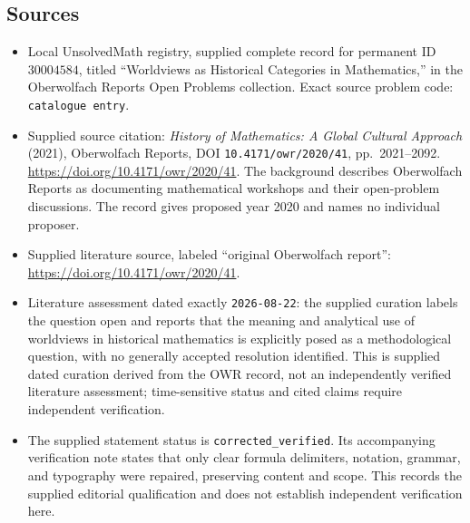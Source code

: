 \documentclass[11pt]{article}
\begin{document}
\subsection{Sources}
\begin{itemize}
\item Local UnsolvedMath registry, supplied complete record for permanent ID \(30004584\), titled ``Worldviews as Historical Categories in Mathematics,'' in the Oberwolfach Reports Open Problems collection. Exact source problem code: \texttt{catalogue entry}.
\item Supplied source citation: \emph{History of Mathematics: A Global Cultural Approach} (2021), Oberwolfach Reports, DOI \texttt{10.4171/owr/2020/41}, pp.~2021--2092. \url{https://doi.org/10.4171/owr/2020/41}. The background describes Oberwolfach Reports as documenting mathematical workshops and their open-problem discussions. The record gives proposed year 2020 and names no individual proposer.
\item Supplied literature source, labeled ``original Oberwolfach report'': \url{https://doi.org/10.4171/owr/2020/41}.
\item Literature assessment dated exactly \texttt{2026-08-22}: the supplied curation labels the question open and reports that the meaning and analytical use of worldviews in historical mathematics is explicitly posed as a methodological question, with no generally accepted resolution identified. This is supplied dated curation derived from the OWR record, not an independently verified literature assessment; time-sensitive status and cited claims require independent verification.
\item The supplied statement status is \texttt{corrected\_verified}. Its accompanying verification note states that only clear formula delimiters, notation, grammar, and typography were repaired, preserving content and scope. This records the supplied editorial qualification and does not establish independent verification here.
\end{itemize}
\end{document}
